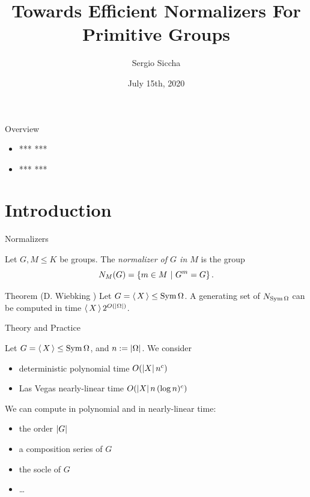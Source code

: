 \documentclass{beamer}
\title{Towards Efficient Normalizers For Primitive Groups}
\date{July 15th, 2020}
\author{Sergio Siccha}
\institute{TU Kaiserslautern}
\theoremstyle{plain}
\theoremstyle{definition}
\newcommand{\TODO}[1]{{\color{red}*** #1 ***}}
\begin{document}
\maketitle
{}

\begin{frame}{Overview}
\begin{itemize}
\setlength{\itemsep}{\fill}
\item \TODO{}
\item \TODO{}
\end{itemize}
\end{frame}

\section{Introduction}
\begin{frame}{Normalizers}

Let $G, M \leq K$ be groups.
The \emph{normalizer of $G$ in $M$} is
the group
\[
N_M(G) =  \left\{  m \in M ~|~ G ^ m = G  \right\} .
\]
\vspace{0.5em}

\pause
\begin{block}{Theorem (D. Wiebking \cite{wiebking:normalizers-simply-exponential})}
Let $G =  \left\langle \, X \, \right\rangle  \leq \operatorname{Sym} \Omega$.
A generating set of $N_{\operatorname{Sym} \Omega}$
can be computed in time $ \left\langle \, X \, \right\rangle  2 ^ {O( \left| \Omega \right| )}$.
\end{block}
\end{frame}


\begin{frame}{Theory and Practice}

Let $G =  \left\langle \, X \, \right\rangle  \leq \operatorname{Sym} \Omega$, and $n :=  \left| \Omega \right| $.
We consider
\begin{itemize}
\item deterministic polynomial time $O( \left| X \right|  n ^ c)$
\item Las Vegas nearly-linear time $O( \left| X \right|  n \, (\log n) ^ c)$
\end{itemize}
\vspace{1em}

\pause
We can compute in polynomial and in nearly-linear time:
\begin{itemize}
\item the order $ \left| G \right| $
\item a composition series of $G$
\item the socle of $G$
\item \ldots
\end{itemize}
\end{frame}
\end{document}
